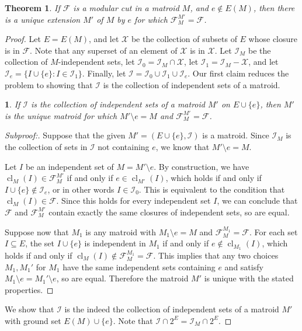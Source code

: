 \documentclass{amsart}
\theoremstyle{plain}
\newtheorem{theorem}{Theorem}[section]
\newtheorem{claim}{}[theorem]
\theoremstyle{definition}
\newcommand{\cF}{\mathcal{F}}
\newcommand{\cI}{\mathcal{I}}
\newcommand{\cX}{\mathcal{X}}
\DeclareMathOperator{\cl}{cl}
\newcommand{\del}{\!\setminus\!}
\newenvironment{subproof}[1][\proofname]{%
  \renewcommand{\qedsymbol}{$\blacksquare$}%
  \begin{proof}[Subproof:]%
}{%
  \end{proof}%
}
\begin{document}
\begin{theorem}\label{modcutextension}
  If $\cF$ is a modular cut in a matroid $M$, and $e \notin E(M)$,
  then there is a unique extension $M'$ of $M$ by $e$ for which $\cF_M^{M'} = \cF$. 
\end{theorem}
\begin{proof}
  Let $E = E(M)$, and let $\cX$ be the collection of subsets of $E$ whose closure is in $\cF$. 
  Note that any superset of an element of $\cX$ is in $\cX$. 
  Let $\cI_M$ be the collection of $M$-independent sets, 
  let $\cI_0 = \cI_M \cap \cX$, let $\cI_1 = \cI_M - \cX$, and let $\cI_e = \{I \cup \{e\} : I \in \cI_1\}$. 
  Finally, let $\cI = \cI_0 \cup \cI_1 \cup \cI_e$. 
  Our first claim reduces the problem to showing that $\cI$ is the collection of independent 
  sets of a matroid. 
  
  \begin{claim}\label{ismatroid}
    If $\cI$ is the collection of independent sets of a matroid $M'$ on $E \cup \{e\}$, 
    then $M'$ is the unique matroid for which $M' \del e = M$ and $\cF_M^{M'} = \cF$.
  \end{claim}
  \begin{subproof}
    Suppose that the given $M' = (E \cup \{e\}, \cI)$ is a matroid. 
    Since $\cI_M$ is the collection of sets in $\cI$ not containing $e$, we know that $M' \del e = M$. 

    Let $I$ be an independent set of $M = M' \del e$. 
    By construction, we have $\cl_M(I) \in \cF_{M}^{M'}$ if and only if $e \in \cl_{M'}(I)$, 
    which holds if and only if $I \cup \{e\} \notin \cI_e$, or in other words $I \in \cI_0$. 
    This is equivalent to the condition that $\cl_M(I) \in \cF$. Since this holds for every 
    independent set $I$, we can conclude that $\cF$ and $\cF_{M}^{M'}$ contain exactly 
    the same closures of independent sets, so are equal. 

    Suppose now that $M_1$ is any matroid with $M_1 \del e = M$ and $\cF_{M}^{M_1} = \cF$. 
    For each set $I \subseteq E$, the set $I \cup \{e\}$ is independent in $M_1$ 
    if and only if $e \notin \cl_{M_1}(I)$, which holds if and only if 
    $\cl_M(I) \notin \cF_{M}^{M_1} = \cF$. This implies that any two choices $M_1, M_1'$ for $M_1$ 
    have the same independent sets containing $e$ and satisfy $M_1 \del e = M_1' \del e$, 
    so are equal. Therefore the matroid $M'$ is unique with the stated properties. 
  \end{subproof}
  
  We show that $\cI$ is the indeed the collection of independent sets of a matroid $M'$ with ground set $E(M) \cup \{e\}$. 
  Note that $\cI \cap 2^{E} = \cI_{M} \cap 2^E$. 
  

\end{proof}
\end{document}
